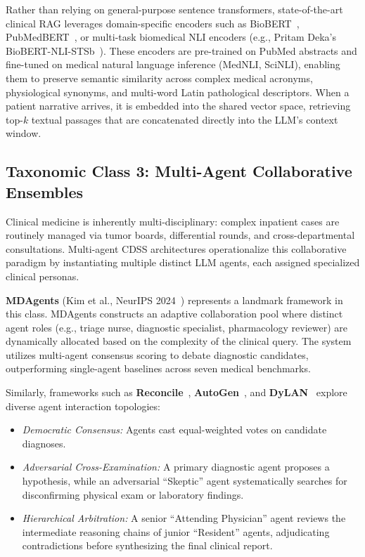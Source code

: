 \documentclass[conference]{IEEEtran}
\begin{document}
Rather than relying on general-purpose sentence transformers, state-of-the-art clinical RAG leverages domain-specific encoders such as BioBERT~\cite{lee2020biobert}, PubMedBERT~\cite{gu2021domain}, or multi-task biomedical NLI encoders (e.g., Pritam Deka's BioBERT-NLI-STSb~\cite{deka2021evidence}). These encoders are pre-trained on PubMed abstracts and fine-tuned on medical natural language inference (MedNLI, SciNLI), enabling them to preserve semantic similarity across complex medical acronyms, physiological synonyms, and multi-word Latin pathological descriptors. When a patient narrative arrives, it is embedded into the shared vector space, retrieving top-$k$ textual passages that are concatenated directly into the LLM's context window.

\subsection{Taxonomic Class 3: Multi-Agent Collaborative Ensembles}
Clinical medicine is inherently multi-disciplinary: complex inpatient cases are routinely managed via tumor boards, differential rounds, and cross-departmental consultations. Multi-agent CDSS architectures operationalize this collaborative paradigm by instantiating multiple distinct LLM agents, each assigned specialized clinical personas.

\textbf{MDAgents} (Kim et al., NeurIPS 2024~\cite{kim2024medagents}) represents a landmark framework in this class. MDAgents constructs an adaptive collaboration pool where distinct agent roles (e.g., triage nurse, diagnostic specialist, pharmacology reviewer) are dynamically allocated based on the complexity of the clinical query. The system utilizes multi-agent consensus scoring to debate diagnostic candidates, outperforming single-agent baselines across seven medical benchmarks.

Similarly, frameworks such as \textbf{Reconcile}~\cite{chen2024reconcile}, \textbf{AutoGen}~\cite{wu2023autogen}, and \textbf{DyLAN}~\cite{liu2023dynamic} explore diverse agent interaction topologies:
\begin{itemize}
    \item \textit{Democratic Consensus:} Agents cast equal-weighted votes on candidate diagnoses.
    \item \textit{Adversarial Cross-Examination:} A primary diagnostic agent proposes a hypothesis, while an adversarial ``Skeptic'' agent systematically searches for disconfirming physical exam or laboratory findings.
    \item \textit{Hierarchical Arbitration:} A senior ``Attending Physician'' agent reviews the intermediate reasoning chains of junior ``Resident'' agents, adjudicating contradictions before synthesizing the final clinical report.
\end{itemize}
\end{document}
